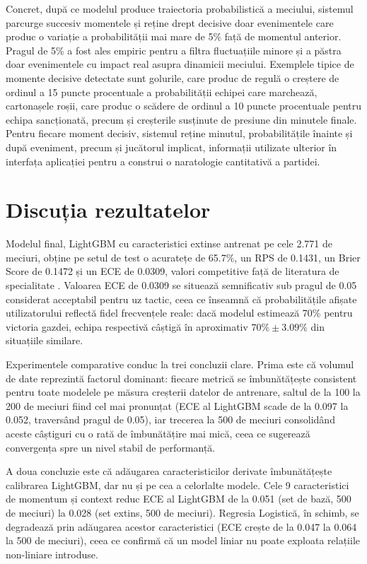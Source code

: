 Concret, după ce modelul produce traiectoria probabilistică a meciului,
sistemul parcurge succesiv momentele și reține drept decisive doar
evenimentele care produc o variație a probabilității mai mare de 5\% față
de momentul anterior. Pragul de 5\% a fost ales empiric pentru a filtra
fluctuațiile minore și a păstra doar evenimentele cu impact real asupra
dinamicii meciului. Exemplele tipice de momente decisive detectate sunt
golurile, care produc de regulă o creștere de ordinul a 15 puncte
procentuale a probabilității echipei care marchează, cartonașele roșii,
care produc o scădere de ordinul a 10 puncte procentuale pentru echipa
sancționată, precum și creșterile susținute de presiune din minutele
finale. Pentru fiecare moment decisiv, sistemul reține minutul,
probabilitățile înainte și după eveniment, precum și jucătorul implicat,
informații utilizate ulterior în interfața aplicației pentru a construi o
naratologie cantitativă a partidei.

\section{Discuția rezultatelor}
\label{sec:discutie}

Modelul final, LightGBM cu caracteristici extinse antrenat pe cele 2.771
de meciuri, obține pe setul de test o acuratețe de 65.7\%, un RPS de
0.1431, un Brier Score de 0.1472 și un ECE de 0.0309, valori competitive
față de literatura de specialitate \cite{Robberechts2019}. Valoarea ECE de
0.0309 se situează semnificativ sub pragul de 0.05 considerat acceptabil
pentru uz tactic, ceea ce înseamnă că probabilitățile afișate utilizatorului
reflectă fidel frecvențele reale: dacă modelul estimează 70\% pentru
victoria gazdei, echipa respectivă câștigă în aproximativ
$70\% \pm 3.09\%$ din situațiile similare.

Experimentele comparative conduc la trei concluzii clare. Prima este că
volumul de date reprezintă factorul dominant: fiecare metrică se
îmbunătățește consistent pentru toate modelele pe măsura creșterii datelor
de antrenare, saltul de la 100 la 200 de meciuri fiind cel mai pronunțat
(ECE al LightGBM scade de la 0.097 la 0.052, traversând pragul de 0.05),
iar trecerea la 500 de meciuri consolidând aceste câștiguri cu o rată de
îmbunătățire mai mică, ceea ce sugerează convergența spre un nivel stabil
de performanță.

A doua concluzie este că adăugarea caracteristicilor derivate îmbunătățește
calibrarea LightGBM, dar nu și pe cea a celorlalte modele. Cele 9
caracteristici de momentum și context reduc ECE al LightGBM de la 0.051
(set de bază, 500 de meciuri) la 0.028 (set extins, 500 de meciuri).
Regresia Logistică, în schimb, se degradează prin adăugarea acestor
caracteristici (ECE crește de la 0.047 la 0.064 la 500 de meciuri), ceea ce
confirmă că un model liniar nu poate exploata relațiile non-liniare
introduse.

